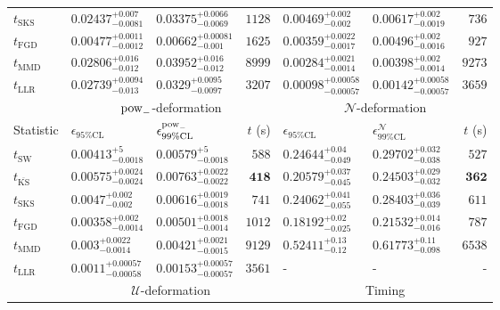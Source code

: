 \begin{tabular}{l|llr|llr}
	$t_{\mathrm{SKS}}$ & $0.02437_{-0.0081}^{+0.007}$ & $0.03375_{-0.0069}^{+0.0066}$ & $1128$ & $0.00469_{-0.002}^{+0.002}$ & $0.00617_{-0.0019}^{+0.002}$ & $736$ \\
	$t_{\mathrm{FGD}}$ & ${\mathbf{0.00477_{-0.0012}^{+0.0011}}}$ & ${\mathbf{0.00662_{-0.001}^{+0.00081}}}$ & $1625$ & $0.00359_{-0.0017}^{+0.0022}$ & $0.00496_{-0.0016}^{+0.002}$ & $927$ \\
	$t_{\mathrm{MMD}}$ & $0.02806_{-0.012}^{+0.016}$ & $0.03952_{-0.012}^{+0.016}$ & $8999$ & ${\mathbf{0.00284_{-0.0014}^{+0.0021}}}$ & ${\mathbf{0.00398_{-0.0014}^{+0.002}}}$ & $9273$ \\
	$t_{\mathrm{LLR}}$ & $0.02739_{-0.013}^{+0.0094}$ & $0.0329_{-0.0097}^{+0.0095}$ & $3207$ & $0.00098_{-0.00057}^{+0.00058}$ & $0.00142_{-0.00057}^{+0.00058}$ & $3659$ \\
	\toprule
	\multicolumn{1}{c}{} & \multicolumn{3}{c}{$\rm{pow}_{-}$-deformation} & \multicolumn{3}{c}{$\mathcal{N}$-deformation} \\
	Statistic & $\epsilon_{95\%\mathrm{CL}}$ & $\epsilon^  {\rm{pow}_{-}}_{99\%\mathrm{CL}}$ & $t$ (s) & $\epsilon_{95\%\mathrm{CL}}$ & $\epsilon^    {\mathcal{N}}_{99\%\mathrm{CL}}$ & $t$ (s) \\
	\midrule
	$t_{\mathrm{SW}}$ & $0.00413_{-0.0018}^{+5}$ & $0.00579_{-0.0018}^{+5}$ & $588$ & $0.24644_{-0.049}^{+0.04}$ & $0.29702_{-0.038}^{+0.032}$ & $527$ \\
	$t_{\overline{\mathrm{KS}}}$ & $0.00575_{-0.0024}^{+0.0024}$ & $0.00763_{-0.0022}^{+0.0022}$ & ${\mathbf{418}}$ & $0.20579_{-0.045}^{+0.037}$ & $0.24503_{-0.032}^{+0.029}$ & ${\mathbf{362}}$ \\
	$t_{\mathrm{SKS}}$ & $0.0047_{-0.002}^{+0.002}$ & $0.00616_{-0.0018}^{+0.0019}$ & $741$ & $0.24062_{-0.055}^{+0.041}$ & $0.28403_{-0.039}^{+0.036}$ & $611$ \\
	$t_{\mathrm{FGD}}$ & $0.00358_{-0.0014}^{+0.002}$ & $0.00501_{-0.0014}^{+0.0018}$ & $1012$ & ${\mathbf{0.18192_{-0.025}^{+0.02}}}$ & ${\mathbf{0.21532_{-0.016}^{+0.014}}}$ & $787$ \\
	$t_{\mathrm{MMD}}$ & ${\mathbf{0.003_{-0.0014}^{+0.0022}}}$ & ${\mathbf{0.00421_{-0.0015}^{+0.0021}}}$ & $9129$ & $0.52411_{-0.12}^{+0.13}$ & $0.61773_{-0.098}^{+0.11}$ & $6538$ \\
	$t_{\mathrm{LLR}}$ & $0.0011_{-0.00058}^{+0.00057}$ & $0.00153_{-0.00057}^{+0.00057}$ & $3561$ & - & - & - \\
	\toprule
	\multicolumn{1}{c}{} & \multicolumn{3}{c}{$\mathcal{U}$-deformation} & \multicolumn{3}{c}{Timing} \\

\end{tabular}
